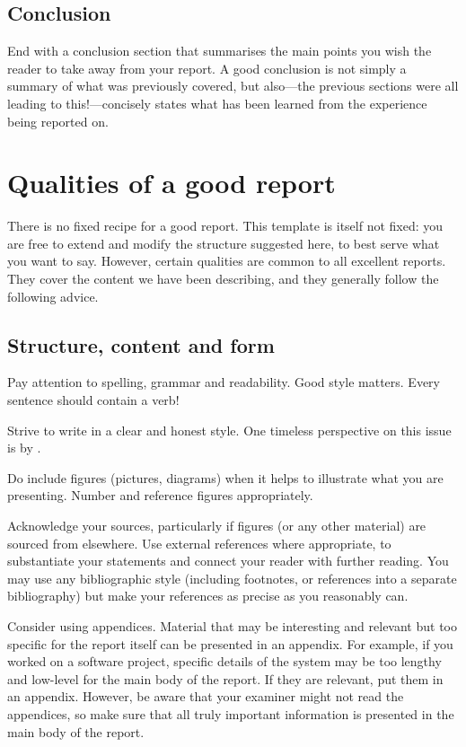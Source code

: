\documentclass[12pt,a4paper,twoside,openright]{report}
\begin{document}
\section{Conclusion}

End with a conclusion section that summarises the main points
you wish the reader to take away from your report.
A good conclusion is not simply a summary of what was previously
covered, but also---the previous sections
were all leading to this!---concisely states what has been learned
from the experience being reported on.

\chapter{Qualities of a good report}

There is no fixed recipe for a good report.
This template is itself not fixed:
you are free to extend and modify the structure suggested here,
to best serve what you want to say.
However, certain qualities are common to all excellent reports.
They cover the content we have been describing,
and they generally follow the following advice.

\section{Structure, content and form}

Pay attention to spelling, grammar and readability.
Good style matters. Every sentence should contain a verb!

Strive to write in a clear and honest style.
One timeless perspective on this issue is by \citet{orwell_politics_1946}.

Do include figures (pictures, diagrams) when it helps to illustrate what you are presenting.
Number and reference figures appropriately.

Acknowledge your sources, particularly if figures (or any other material)
are sourced from elsewhere.
Use external references where appropriate,
to substantiate your statements and connect your reader with further reading.
You may use any bibliographic style (including footnotes, or references
into a separate bibliography) but make your references as precise as you reasonably can.

Consider using appendices.
Material that may be interesting and relevant but too specific for the report itself
can be presented in an appendix.
For example, if you worked on a software project,
specific details of the system may be too lengthy and low-level for the main body of the report.
If they are relevant, put them in an appendix.
However, be aware that your examiner might not read the appendices,
so make sure that all truly important information
is presented in the main body of the report.
\end{document}
